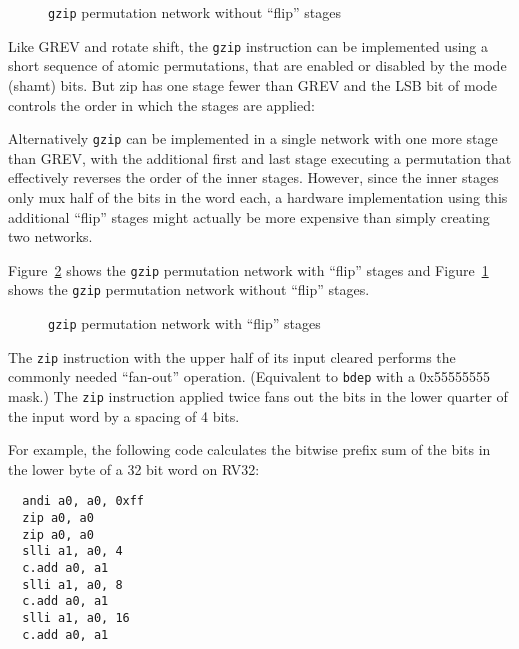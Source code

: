 \begin{figure}[t]
\begin{center}

\end{center}
\caption{\texttt{gzip} permutation network without ``flip'' stages}
\label{permnet-gzip-noflip}
\end{figure}

Like GREV and rotate shift, the {\tt gzip} instruction can be implemented using a short
sequence of atomic permutations, that are enabled or disabled by the mode (shamt)
bits. But zip has one stage fewer than GREV and the LSB bit of mode controls the order
in which the stages are applied:



Alternatively {\tt gzip} can be implemented in a single network with one more
stage than GREV, with the additional first and last stage executing a
permutation that effectively reverses the order of the inner stages. However,
since the inner stages only mux half of the bits in the word each, a hardware
implementation using this additional ``flip'' stages might actually be more
expensive than simply creating two networks.



Figure~\ref{permnet-gzip-flip} shows the {\tt gzip} permutation network with
``flip'' stages and Figure~\ref{permnet-gzip-noflip} shows the {\tt gzip}
permutation network without ``flip'' stages.

\begin{figure}[t]
\begin{center}

\end{center}
\caption{\texttt{gzip} permutation network with ``flip'' stages}
\label{permnet-gzip-flip}
\end{figure}

The \texttt{zip} instruction with the upper half of its input cleared performs
the commonly needed ``fan-out'' operation. (Equivalent to {\tt bdep} with a
0x55555555 mask.) The \texttt{zip} instruction applied twice fans out the bits
in the lower quarter of the input word by a spacing of 4 bits.

For example, the following code calculates the bitwise prefix sum of the bits
in the lower byte of a 32 bit word on RV32:

\begin{verbatim}
  andi a0, a0, 0xff
  zip a0, a0
  zip a0, a0
  slli a1, a0, 4
  c.add a0, a1
  slli a1, a0, 8
  c.add a0, a1
  slli a1, a0, 16
  c.add a0, a1
\end{verbatim}

